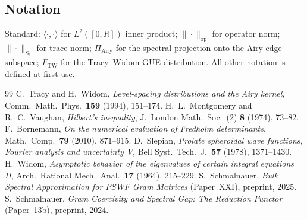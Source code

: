 \documentclass[12pt,a4paper]{amsart}
\begin{document}
\subsection*{Notation}
Standard: $\langle \cdot, \cdot \rangle$ for $L^2([0,R])$ inner product;
$\|\cdot\|_{\mathrm{op}}$ for operator norm; $\|\cdot\|_{S_1}$ for trace norm;
$\Pi_{\mathrm{Airy}}$ for the spectral projection onto the Airy edge subspace;
$F_{\mathrm{TW}}$ for the Tracy--Widom GUE distribution.
All other notation is defined at first use.

\begin{thebibliography}{99}
C.~Tracy and H.~Widom,
\textit{Level-spacing distributions and the Airy kernel},
Comm.\ Math.\ Phys.\ \textbf{159} (1994), 151--174.
H.~L.~Montgomery and R.~C.~Vaughan,
\textit{Hilbert's inequality},
J.\ London Math.\ Soc.\ (2) \textbf{8} (1974), 73--82.
F.~Bornemann,
\textit{On the numerical evaluation of Fredholm determinants},
Math.\ Comp.\ \textbf{79} (2010), 871--915.
D.~Slepian,
\textit{Prolate spheroidal wave functions, Fourier analysis and uncertainty V},
Bell Syst.\ Tech.\ J.\ \textbf{57} (1978), 1371--1430.
H.~Widom,
\textit{Asymptotic behavior of the eigenvalues of certain integral equations II},
Arch.\ Rational Mech.\ Anal.\ \textbf{17} (1964), 215--229.
S.~Schmalnauer,
\textit{Bulk Spectral Approximation for PSWF Gram Matrices} (Paper~XXI),
preprint, 2025.
S.~Schmalnauer,
\textit{Gram Coercivity and Spectral Gap: The Reduction Functor} (Paper~13b),
preprint, 2024.
\end{thebibliography}
\end{document}

